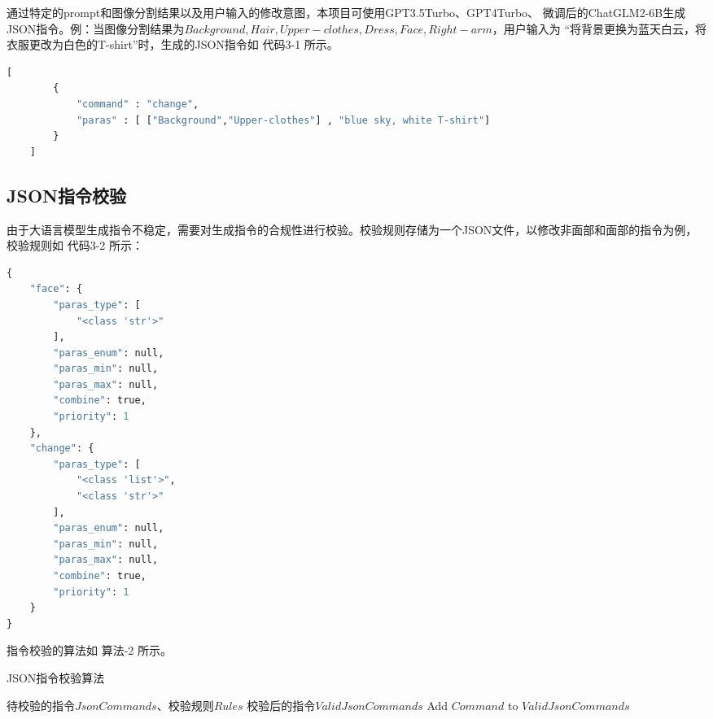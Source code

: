 \documentclass[a4paper,AutoFakeBold,oneside,12pt]{book}
\begin{document}
通过特定的prompt和图像分割结果以及用户输入的修改意图，本项目可使用GPT3.5Turbo、GPT4Turbo、
微调后的ChatGLM2-6B生成JSON指令。例：当图像分割结果为$Background, Hair, Upper-clothes, Dress, Face, Right-arm$，用户输入为
“将背景更换为蓝天白云，将衣服更改为白色的T-shirt”时，生成的JSON指令如 代码3-1 所示。

\begin{lstlisting}[language=Python, caption=生成的指令, label=plus, tabsize=2]  
    [
        {
            "command" : "change",
            "paras" : [ ["Background","Upper-clothes"] , "blue sky, white T-shirt"]
        }
    ]
\end{lstlisting} 

\subsection{JSON指令校验}
由于大语言模型生成指令不稳定，需要对生成指令的合规性进行校验。校验规则存储为一个JSON文件，以修改非面部和面部的指令为例，校验规则如 代码3-2 所示：
\begin{lstlisting}[language=Python, caption=指令校验规则, label=plus, tabsize=2]  
    {
    "face": {
        "paras_type": [
            "<class 'str'>"
        ],
        "paras_enum": null,
        "paras_min": null,
        "paras_max": null,
        "combine": true,
        "priority": 1
    },
    "change": {
        "paras_type": [
            "<class 'list'>",
            "<class 'str'>"
        ],
        "paras_enum": null,
        "paras_min": null,
        "paras_max": null,
        "combine": true,
        "priority": 1
    }
}
\end{lstlisting} 
指令校验的算法如 算法-2 所示。
\begin{algorithm} 
	\begin{spacing}{1.3}
		\caption{JSON指令校验算法} 
		\label{JsonCommandCheckAlgorithm}
		\renewcommand{\algorithmicrequire}{\textbf{输入：}}
		\renewcommand{\algorithmicensure}{\textbf{输出：}} 
			\begin{algorithmic}[1] 
				\Require 待校验的指令$JsonCommands$、校验规则$Rules$
				\Ensure 校验后的指令$ValidJsonCommands$
                        \State Add $Command$ to $ValidJsonCommands$
                    \EndIf
                \EndFor
			\end{algorithmic}
	\end{spacing}
\end{algorithm}
\end{document}
